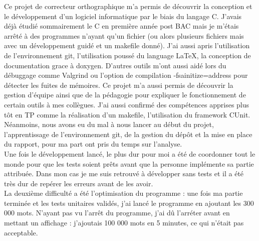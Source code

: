 Ce projet de correcteur orthographique m'a permis de découvrir la conception et le développement d'un logiciel informatique par le biais du langage C.
J'avais déjà étudié sommairement le C en première année post BAC mais je m'étais arrêté à des programmes n'ayant qu'un fichier 
(ou alors plusieurs fichiers mais avec un développement guidé et un makefile donné).
J'ai aussi apris l'utilisation de l'environnement git, l'utilisation poussé du language \LaTeX, la conception de documentation grace à doxygen.
D'autres outils m'ont aussi aidé lors du débuggage comme Valgrind ou l'option de compilation -fsainitize=address pour détecter les fuites de mémoires. 
Ce projet m'a aussi permis de découvrir la gestion d'équipe ainsi que de la pédagogie pour expliquer le fonctionnement de certain outils à  mes collègues. 
J'ai aussi confirmé des compétences apprises plus tôt en TP comme la réalisation d'un makefile, l'utilisation du framework CUnit.\\

Néanmoins, nous avons eu du mal à nous lancer au début du projet, l'apprentissage de l'environnement git, de la gestion du dépôt et la mise en place du rapport, 
pour ma part ont pris du temps sur l'analyse.\\

Une fois le développement lancé, le plus dur pour moi a été de coordonner tout le monde pour que les tests soient prêts avant que la personne implémente sa partie attribuée.
Dans mon cas je me suis retrouvé à développer sans tests et il a été très dur de repérer les erreurs avant de les avoir.\\

La deuxième difficulté a été l'optimisation du programme : une fois ma partie terminée et les tests unitaires validés, j'ai lancé le programme en ajoutant les 300 000 mots. N'ayant pas vu l'arrêt du programme, j'ai dû l'arréter avant en mettant un affichage : j'ajoutais 100 000 mots en 5 minutes, ce qui n'était pas acceptable.
